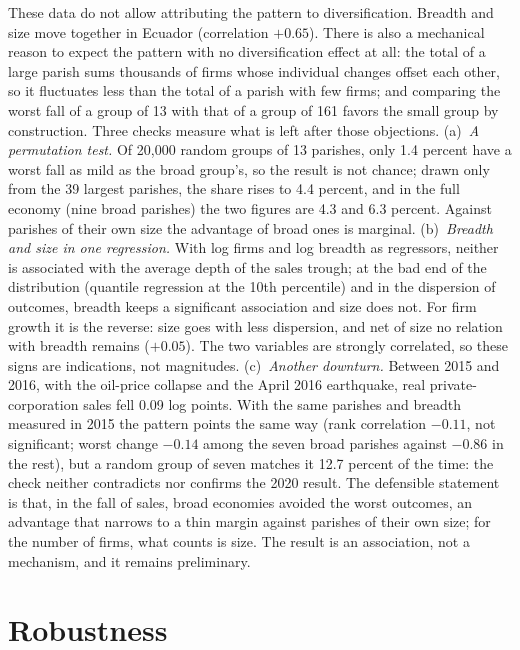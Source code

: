 \documentclass[conference]{IEEEtran}
\begin{document}
These data do not allow attributing the pattern to diversification.
Breadth and size move together in Ecuador (correlation $+0.65$). There is
also a mechanical reason to expect the pattern with no diversification
effect at all: the total of a large parish sums thousands of firms whose
individual changes offset each other, so it fluctuates less than the
total of a parish with few firms; and comparing the worst fall of a group
of 13 with that of a group of 161 favors the small group by
construction. Three checks measure what is left after those objections.
(a)~\textit{A permutation test.} Of 20{,}000 random groups of 13
parishes, only 1.4 percent have a worst fall as mild as the broad
group's, so the result is not chance; drawn only from the 39 largest
parishes, the share rises to 4.4 percent, and in the full economy (nine
broad parishes) the two figures are 4.3 and 6.3 percent. Against parishes
of their own size the advantage of broad ones is marginal.
(b)~\textit{Breadth and size in one regression.} With log firms and log
breadth as regressors, neither is associated with the average depth of
the sales trough; at the bad end of the distribution (quantile regression
at the 10th percentile) and in the dispersion of outcomes, breadth keeps
a significant association and size does not. For firm growth it is the
reverse: size goes with less dispersion, and net of size no relation with
breadth remains ($+0.05$). The two variables are strongly correlated, so
these signs are indications, not magnitudes. (c)~\textit{Another
downturn.} Between 2015 and 2016, with the oil-price collapse and the
April 2016 earthquake, real private-corporation sales fell 0.09 log
points. With the same parishes and breadth measured in 2015 the pattern
points the same way (rank correlation $-0.11$, not significant; worst
change $-0.14$ among the seven broad parishes against $-0.86$ in the
rest), but a random group of seven matches it 12.7 percent of the time:
the check neither contradicts nor confirms the 2020 result. The
defensible statement is that, in the fall of sales, broad economies
avoided the worst outcomes, an advantage that narrows to a thin margin
against parishes of their own size; for the number of firms, what counts
is size. The result is an association, not a mechanism, and it remains
preliminary.

\section{Robustness}
\end{document}
